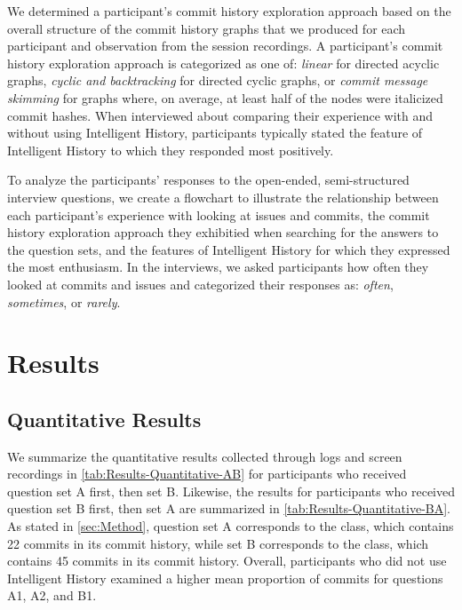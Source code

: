 We determined a participant's commit history exploration approach based on the overall structure 
of the commit history graphs that we produced for each participant and observation from the session recordings.
A participant's commit history exploration approach is categorized as one of:
\textit{linear} for directed acyclic graphs, 
\textit{cyclic and backtracking} for directed cyclic graphs, 
or \textit{commit message skimming} for graphs where, on average, at least half of the nodes were italicized commit hashes.
When interviewed about comparing their experience with and without using Intelligent History,
participants typically stated the feature of Intelligent History to which they responded most positively.

To analyze the participants' responses to the open-ended, semi-structured interview questions, 
we create a flowchart to illustrate the relationship between each participant's experience with looking at issues and commits,
the commit history exploration approach they exhibitied when searching for the answers to the question sets, 
and the features of Intelligent History for which they expressed the most enthusiasm.
In the interviews, we asked participants how often they looked at commits and issues 
and categorized their responses as: 
\textit{often}, \textit{sometimes}, or \textit{rarely}.

\section{Results}
\label{sec:Results}

\subsection{Quantitative Results}

We summarize the quantitative results collected through logs and screen recordings in \autoref{tab:Results-Quantitative-AB} 
for participants who received question set A first, then set B.
Likewise, the results for participants who received question set B first, then set A are summarized in \autoref{tab:Results-Quantitative-BA}.
As stated in \autoref{sec:Method}, question set A corresponds to the  class, which contains 22 commits in its commit history, 
while set B corresponds to the  class, which contains 45 commits in its commit history.
Overall, participants who did not use Intelligent History examined a higher mean proportion of commits for questions A1, A2, and B1.

